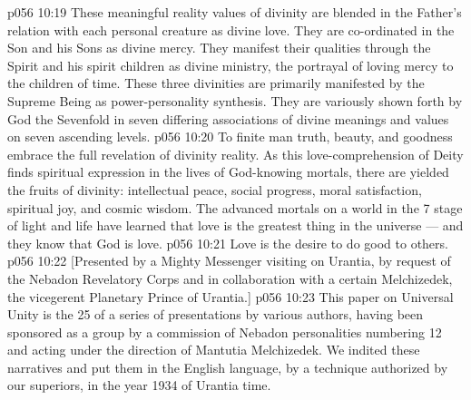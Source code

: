 \vs p056 10:19 These meaningful reality values of divinity are blended in the Father’s relation with each personal creature as divine love. They are co\hyp{}ordinated in the Son and his Sons as divine mercy. They manifest their qualities through the Spirit and his spirit children as divine ministry, the portrayal of loving mercy to the children of time. These three divinities are primarily manifested by the Supreme Being as power\hyp{}personality synthesis. They are variously shown forth by God the Sevenfold in seven differing associations of divine meanings and values on seven ascending levels.
\vs p056 10:20 \pc To finite man truth, beauty, and goodness embrace the full revelation of divinity reality. As this love\hyp{}comprehension of Deity finds spiritual expression in the lives of God\hyp{}knowing mortals, there are yielded the fruits of divinity: intellectual peace, social progress, moral satisfaction, spiritual joy, and cosmic wisdom. The advanced mortals on a world in the 7 stage of light and life have learned that love is the greatest thing in the universe --- and they know that God is love.
\vs p056 10:21 \pc Love is the desire to do good to others.
\vsetoff
\vs p056 10:22 [Presented by a Mighty Messenger visiting on Urantia, by request of the Nebadon Revelatory Corps and in collaboration with a certain Melchizedek, the vicegerent Planetary Prince of Urantia.]
\separatorline
\vs p056 10:23 This paper on Universal Unity is the 25 of a series of presentations by various authors, having been sponsored as a group by a commission of Nebadon personalities numbering 12 and acting under the direction of Mantutia Melchizedek. We indited these narratives and put them in the English language, by a technique authorized by our superiors, in the year 1934 of Urantia time.
\quizlink
